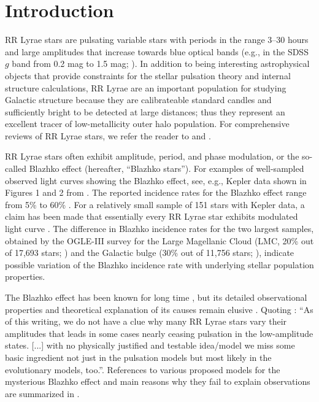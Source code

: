 
\section{Introduction\label{sec:intro}}


RR Lyrae stars are pulsating variable stars with periods in the range 3--30 hours and large amplitudes
that increase towards blue optical bands (e.g., in the SDSS $g$ band from 0.2 mag to 1.5 mag;
\citealt{2010ApJ...708..717S}). In addition to being interesting astrophysical objects that provide
constraints for the stellar pulsation theory and internal structure calculations, RR Lyrae are an important
population for studying  Galactic structure because they are calibrateable standard candles and sufficiently
bright to be detected at large distances;  thus they represent an excellent tracer of low-metallicity outer
halo population. For comprehensive reviews of RR Lyrae stars, we refer the reader to \cite{1995CAS....27.....S}
and \cite{2009Ap&SS.320..261C}.

RR Lyrae stars often exhibit amplitude, period, and phase modulation, or the so-called Blazhko effect (hereafter,
``Blazhko stars''). For examples of well-sampled observed light curves showing the Blazhko effect, see,  e.g., Kepler
data shown in Figures 1 and 2 from \cite{2010MNRAS.409.1585B}. The reported incidence rates for the Blazhko effect
range from 5\% \citep{2007MNRAS.377.1263S} to 60\% \citep{2014A&A...570A.100S}. For a relatively small sample of
151 stars with Kepler data, a claim has been made that essentially every RR Lyrae star exhibits modulated light curve
\citep{2018A&A...614L...4K}. The difference in Blazhko incidence rates for the two largest samples, obtained
by the OGLE-III survey for the Large Magellanic Cloud (LMC, 20\% out of 17,693 stars; \citealt{2009AcA....59....1S})
and the Galactic bulge (30\% out of 11,756 stars; \citealt{2011AcA....61....1S}), indicate possible variation of
the Blazhko incidence rate with underlying stellar population properties. 

The Blazhko effect has been known for long time \citep{1907AN....175..325B}, but its detailed observational
properties and theoretical explanation of its causes remain elusive \cite{2009AIPC.1170..261K}.
Quoting \cite{2016CoKon.105...61K}: ``As of this writing, we do not have a clue why many RR Lyrae
stars vary their amplitudes that leads in some cases nearly ceasing pulsation in the low-amplitude
states. [...] with no physically justified and testable idea/model we miss some basic ingredient not just
in the pulsation models but most likely in the evolutionary models, too.''. 
References to various proposed models for the mysterious Blazhko effect and main
reasons why they fail to explain observations are summarized in \cite{2016CoKon.105...61K}. 

